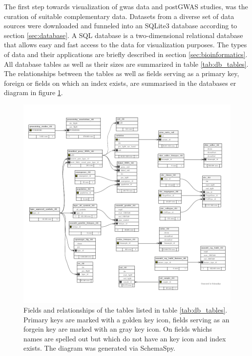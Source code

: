     The first step towards visualization of \ac{gwas} data and postGWAS studies, was the curation of suitable complementary data. Datasets from a diverse set of data sources were downloaded and funneled into an SQLite3 database according to section \ref{sec:database}. A SQL database is a two-dimensional relational database that allows easy and fast access to the data for visualization purposes. The types of data and their applications are briefly described in section \ref{sec:bioinformatics}. All database tables as well as their sizes are summarized in table \ref{tab:db_tables}. The relationships between the tables as well as fields serving as a primary key, foreign or fields on which an index exists, are summarised in the databases \ac{er} diagram in figure \ref{fig:db_er}.

    \begin{figure}[h!]
    \capstart
        \centering
        \includegraphics{Abbildung/db-schema.pdf}

        \begin{minipage}{\captionwidth}
            \caption[database]{\newline
            Fields and relationships of the tables listed in table \ref{tab:db_tables}. Primary keys are marked with a golden key icon, fields serving as an forgein key are marked with an gray key icon. On fields whichs names are spelled out but which do not have an key icon and index exists. The diagram was generated via SchemaSpy.}
            \label{fig:db_er}
        \end{minipage}
    \end{figure}


